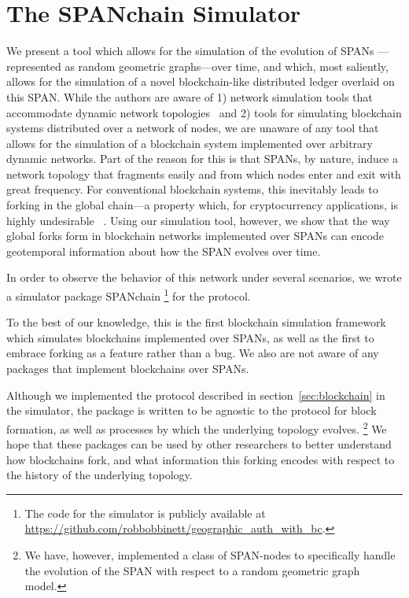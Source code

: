 \section{The SPANchain Simulator}
\label{sec:SPANchain}

We present a tool which allows for the simulation of the evolution of SPANs%
---represented as random geometric graphs---over time, and which, most saliently,
allows for the simulation of a novel blockchain-like distributed ledger overlaid
on this SPAN. While the authors are aware of 1) network simulation tools that
accommodate dynamic network topologies~\cite{chaudhary2012study} and
2) tools for simulating blockchain
systems distributed over a network of nodes, we are unaware of any tool that
allows for the simulation of a blockchain system implemented over arbitrary dynamic
networks. Part of the reason for this is that SPANs, by nature, induce a network topology
that fragments easily and from which nodes enter and exit with great frequency. For
conventional blockchain systems, this inevitably leads to forking in the global
chain---a property which, for cryptocurrency applications, is highly undesirable
~\cite{decker_2013,nakamoto2008bitcoin}. Using our simulation tool, however, we show
that the way global forks form in blockchain networks implemented over SPANs can encode
geotemporal information about how the SPAN evolves over time.

In order to observe the behavior of this network under several scenarios,
we wrote a simulator package SPANchain%
\footnote{
	The code for the simulator is publicly available at
	\url{https://github.com/robbobbinett/geographic_auth_with_bc}.
}
for the protocol.

To the best of our knowledge,
this is the first blockchain simulation framework which simulates
blockchains implemented over SPANs, as well as the first
to embrace forking as a feature rather than a bug.
We also are not aware of any packages that implement blockchains over SPANs.

Although we implemented the protocol
described in section~\ref{sec:blockchain}
in the simulator,
the package is written to be agnostic to the protocol for block formation,
as well as processes by which the underlying topology evolves.%
\footnote{
	We have, however,
	implemented a class of SPAN-nodes
	to specifically handle the evolution of the SPAN
	with respect to a random geometric graph model.
}
We hope that these packages can be used by other researchers
to better understand how blockchains fork, and what information this forking
encodes with respect to the history of the underlying topology.
